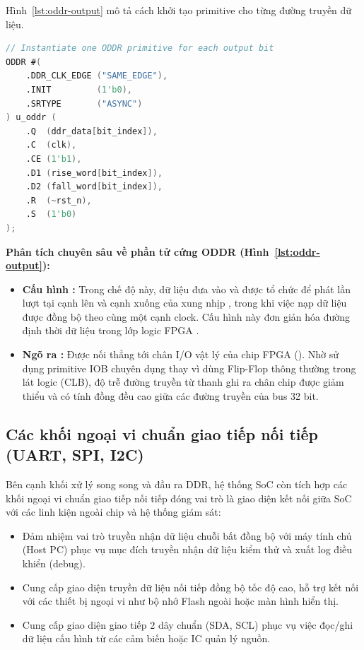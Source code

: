 Hình~\ref{lst:oddr-output} mô tả cách khởi tạo primitive  cho từng đường truyền dữ liệu.

\begin{lstlisting}[language=Verilog, caption={Khởi tạo phần tử cứng ODDR trong AMD/Xilinx FPGA.}, label={lst:oddr-output}]
// Instantiate one ODDR primitive for each output bit
ODDR #(
    .DDR_CLK_EDGE ("SAME_EDGE"),
    .INIT         (1'b0),
    .SRTYPE       ("ASYNC")
) u_oddr (
    .Q  (ddr_data[bit_index]),
    .C  (clk),
    .CE (1'b1),
    .D1 (rise_word[bit_index]),
    .D2 (fall_word[bit_index]),
    .R  (~rst_n),
    .S  (1'b0)
);
\end{lstlisting}

\textbf{Phân tích chuyên sâu về phần tử cứng ODDR (Hình~\ref{lst:oddr-output}):}
\begin{itemize}
    \item \textbf{Cấu hình :} Trong chế độ này, dữ liệu đưa vào  và  được tổ chức để phát lần lượt tại cạnh lên và cạnh xuống của xung nhịp , trong khi việc nạp dữ liệu được đồng bộ theo cùng một cạnh clock. Cấu hình này đơn giản hóa đường định thời dữ liệu trong lớp logic FPGA \cite{amd_ug471}.
    \item \textbf{Ngõ ra :} Được nối thẳng tới chân I/O vật lý của chip FPGA (). Nhờ sử dụng primitive IOB chuyên dụng thay vì dùng Flip-Flop thông thường trong lát logic (CLB), độ trễ đường truyền từ thanh ghi ra chân chip được giảm thiểu và có tính đồng đều cao giữa các đường truyền của bus 32 bit.
\end{itemize}

\subsection{Các khối ngoại vi chuẩn giao tiếp nối tiếp (UART, SPI, I2C)}

Bên cạnh khối xử lý song song và đầu ra DDR, hệ thống SoC còn tích hợp các khối ngoại vi chuẩn giao tiếp nối tiếp đóng vai trò là giao diện kết nối giữa SoC với các linh kiện ngoài chip và hệ thống giám sát:

\begin{itemize}
    \item {} Đảm nhiệm vai trò truyền nhận dữ liệu chuỗi bất đồng bộ với máy tính chủ (Host PC) phục vụ mục đích truyền nhận dữ liệu kiểm thử và xuất log điều khiển (debug).
    \item {} Cung cấp giao diện truyền dữ liệu nối tiếp đồng bộ tốc độ cao, hỗ trợ kết nối với các thiết bị ngoại vi như bộ nhớ Flash ngoài hoặc màn hình hiển thị.
    \item {} Cung cấp giao diện giao tiếp 2 dây chuẩn (SDA, SCL) phục vụ việc đọc/ghi dữ liệu cấu hình từ các cảm biến hoặc IC quản lý nguồn.
\end{itemize}

